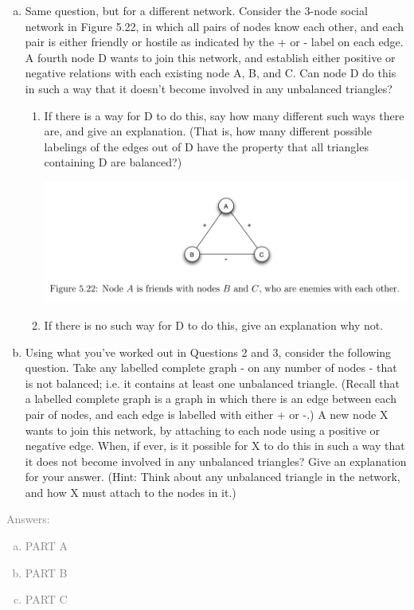 \documentclass[11pt]{article}
\begin{document}
\begin{enumerate}
\begin{enumerate}[(a)]
		\item Same question, but for a different network. Consider the 3-node social network in Figure 5.22, in which all pairs of nodes know each other, and each pair is either friendly or hostile as indicated by the + or - label on each edge. A fourth node D wants to join this network, and establish either positive or negative relations with each existing node A, B, and C. Can node D do this in such a way that it doesn’t become involved in any unbalanced triangles?
		\begin{enumerate}[*]
			\item  If there is a way for D to do this, say how many different such ways there are, and give an explanation. (That is, how many different possible labelings of the edges out of D have the property that all triangles containing D are balanced?)
			\begin{center}
				\includegraphics[scale=1]{Figure_5_22}\\
			\end{center}
			\item If there is no such way for D to do this, give an explanation why not.
		\end{enumerate}
		\item Using what you’ve worked out in Questions 2 and 3, consider the following question. Take any labelled complete graph - on any number of nodes - that is not balanced; i.e. it contains at least one unbalanced triangle. (Recall that a labelled complete graph is a graph in which there is an edge between each pair of nodes, and each edge is labelled with either + or -.) A new node X wants to join this network, by attaching to each node using a positive or negative edge. When, if ever, is it possible for X to do this in such a way that it does not become involved in any unbalanced triangles? Give an explanation for your answer. (Hint: Think about any unbalanced triangle in the network, and how X must attach to the nodes in it.)
	\end{enumerate}
\end{enumerate}
\textcolor{gray}{
Answers:
\begin{enumerate}[(a)]
	\item PART A
	\item PART B
	\item PART C
\end{enumerate}}
\end{document}
